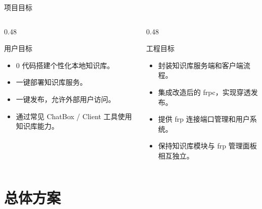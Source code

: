 \documentclass[aspectratio=169]{beamer}
\begin{document}
\begin{frame}{项目目标}
    \begin{columns}[T]
        \begin{column}{0.48\textwidth}
            \begin{block}{用户目标}
                \begin{itemize}
                    \item 0 代码搭建个性化本地知识库。
                    \item 一键部署知识库服务。
                    \item 一键发布，允许外部用户访问。
                    \item 通过常见 ChatBox / Client 工具使用知识库能力。
                \end{itemize}
            \end{block}
        \end{column}
        \begin{column}{0.48\textwidth}
            \begin{block}{工程目标}
                \begin{itemize}
                    \item 封装知识库服务端和客户端流程。
                    \item 集成改造后的 frpc，实现穿透发布。
                    \item 提供 frp 连接端口管理和用户系统。
                    \item 保持知识库模块与 frp 管理面板相互独立。
                \end{itemize}
            \end{block}
        \end{column}
    \end{columns}
\end{frame}

\section{总体方案}
\end{document}
